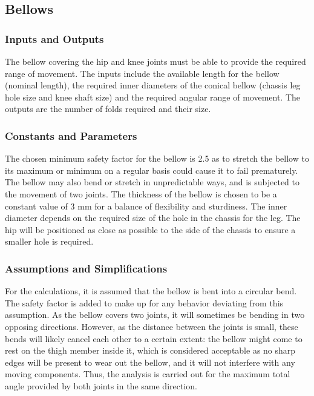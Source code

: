 \subsection{Bellows} \label{subsec:bellows}

\subsubsection{Inputs and Outputs}
The bellow covering the hip and knee joints must be able to provide the required range of movement. The inputs include the available length for the bellow (nominal length), the required inner diameters of the conical bellow (chassis leg hole size and knee shaft size) and the required angular range of movement. The outputs are the number of folds required and their size. 

\subsubsection{Constants and Parameters}
The chosen minimum safety factor for the bellow is 2.5 as to stretch the bellow to its maximum or minimum on a regular basis could cause it to fail prematurely. The bellow may also bend or stretch in unpredictable ways, and is subjected to the movement of two joints. 
The thickness of the bellow is chosen to be a constant value of 3 mm for a balance of flexibility and sturdiness. The inner diameter depends on the required size of the hole in the chassis for the leg. The hip will be positioned as close as possible to the side of the chassis to ensure a smaller hole is required.

\subsubsection{Assumptions and Simplifications}
For the calculations, it is assumed that the bellow is bent into a circular bend. The safety factor is added to make up for any behavior deviating from this assumption. As the bellow covers two joints, it will sometimes be bending in two opposing directions. However, as the distance between the joints is small, these bends will likely cancel each other to a certain extent: the bellow might come to rest on the thigh member inside it, which is considered acceptable as no sharp edges will be present to wear out the bellow, and it will not interfere with any moving components. Thus, the analysis is carried out for the maximum total angle provided by both joints in the same direction.

